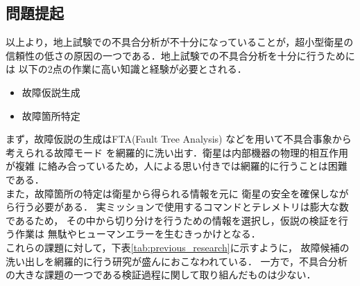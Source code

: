 \documentclass[11pt]{jsarticle}%
\begin{document}
\begin{multicols}{2}
  \subsection{問題提起}
  \vspace{-1zh}
  以上より，地上試験での不具合分析が不十分になっていることが，超小型衛星の
  信頼性の低さの原因の一つである．地上試験での不具合分析を十分に行うためには
  以下の2点の作業に高い知識と経験が必要とされる．
  \begin{itemize}
    \item 故障仮説生成
    \item 故障箇所特定
  \end{itemize}
  まず，故障仮説の生成はFTA(Fault Tree Analysis)%
  などを用いて不具合事象から考えられる故障モード
  を網羅的に洗い出す．衛星は内部機器の物理的相互作用が複雑
  に絡み合っているため，人による思い付きでは網羅的に行うことは困難である．\\
  また，故障箇所の特定は衛星から得られる情報を元に
  衛星の安全を確保しながら行う必要がある．
  実ミッションで使用するコマンドとテレメトリは膨大な数であるため，
その中から切り分けを行うための情報を選択し，仮説の検証を行う作業は
無駄やヒューマンエラーを生むきっかけとなる．\\
これらの課題に対して，下表\ref{tab:previous_research}に示すように，
故障候補の洗い出しを網羅的に行う研究が盛んにおこなわれている．
一方で，不具合分析の大きな課題の一つである検証過程に関して取り組んだものは少ない．
\vspace{-1zh}
\begin{table}[H]
  \centering
  \caption{不具合分析手法の比較}
  \label{tab:previous_research}
\end{table}
\vspace{-1zh}

\end{multicols}
\end{document}
